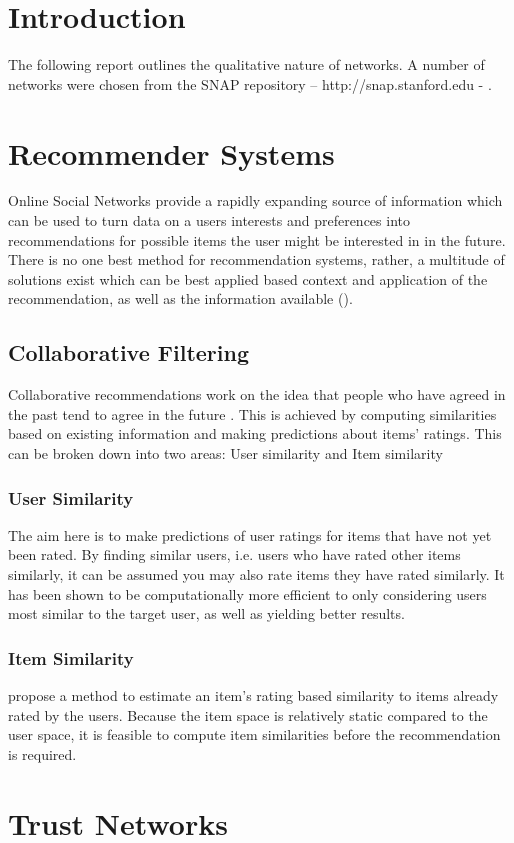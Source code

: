 \documentclass[a4paper,11pt,article,oneside]{memoir}
\begin{document}
	
	\tableofcontents
	\chapter{Introduction}
	The following report outlines the qualitative nature of networks. A number of networks were chosen from the SNAP repository –	http://snap.stanford.edu - 
	. 
	
	
	\newpage
	\chapter{Recommender Systems}
	
	
	Online Social Networks provide a rapidly expanding source of information which can be used to turn data on a users interests and preferences into recommendations for possible items the user might be interested in in the future. There is no one best method for recommendation systems, rather, a multitude of solutions exist which can be best applied based context and application of the recommendation, as well as the information available  (\cite{Lu2012Recommender}).
	
	\section{Collaborative Filtering}
	Collaborative recommendations work on the idea that people who have agreed in the past tend to agree in the future {\cite{zeng2010can}}. This is achieved by computing similarities based on existing information and making predictions about items' ratings. This can be broken down into two areas: User similarity and Item similarity
	\subsection{User Similarity} 
	The aim here is to make predictions of user ratings for items that have not yet been rated. By finding similar users, i.e. users who have rated other items similarly, it can be assumed you may also rate items they have rated similarly. It has been shown to be computationally more efficient to only considering users most similar to the target user, as well as yielding better results. {\cite{goldberg2001eigentaste}}
	\subsection{Item Similarity} 
	{\cite{sarwar2001item}} propose a method to estimate an item's rating based similarity to items already rated by the users. Because the item space is relatively static compared to the user space, it is feasible to compute item similarities before the recommendation is required. 	

	\chapter{Trust Networks}
	\newpage
	\nocite{*}
	
\end{document}

